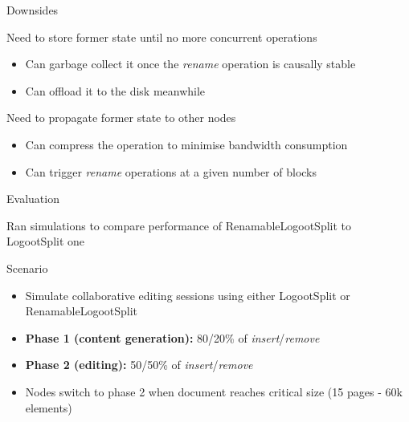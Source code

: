 \documentclass[10pt]{beamer}
\begin{document}
\begin{frame}{Downsides}
  \begin{block}{Need to store former state until no more concurrent operations}
    \begin{itemize}
      \item Can garbage collect it once the \emph{rename} operation is causally stable 
      \item Can offload it to the disk meanwhile
    \end{itemize}
  \end{block}

  \begin{block}{Need to propagate former state to other nodes}
    \begin{itemize}
      \item Can compress the operation to minimise bandwidth consumption
      \item Can trigger \emph{rename} operations at a given number of blocks
    \end{itemize}
  \end{block}
\end{frame}

\begin{frame}[standout]
  \alert{Evaluation}

  \bigskip
  Ran simulations to compare performance of RenamableLogootSplit to LogootSplit one
\end{frame}



\begin{frame}{Scenario}
  \begin{itemize}
    \item Simulate collaborative editing sessions using either LogootSplit or RenamableLogootSplit
    \item \textbf{Phase 1 (content generation):} 80/20\% of \emph{insert}/\emph{remove}
    \item \textbf{Phase 2 (editing):} 50/50\% of \emph{insert}/\emph{remove}
    \item Nodes switch to phase 2 when document reaches critical size (15 pages - 60k elements)
  \end{itemize}
\end{frame}
\end{document}

